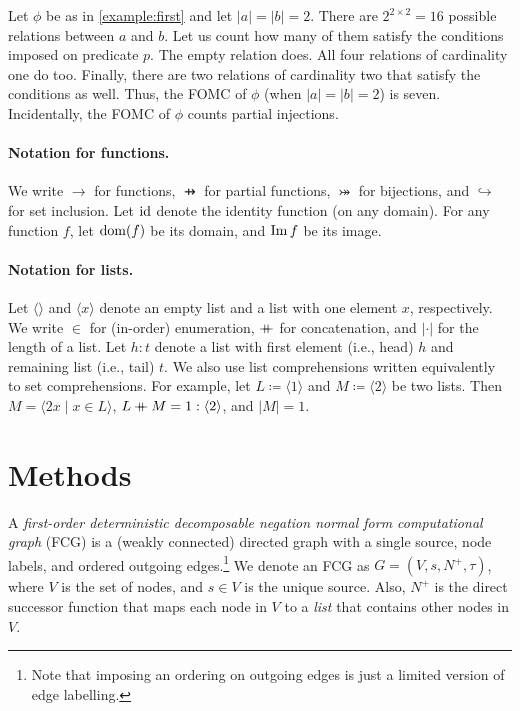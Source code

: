 \begin{example}
  Let $\phi$ be as in \cref{example:first} and let $|a| = |b| = 2$. There are
  $2^{2 \times 2} = 16$ possible relations between $a$ and $b$. Let us count how
  many of them satisfy the conditions imposed on predicate $p$. The empty
  relation does. All four relations of cardinality one do too. Finally, there
  are two relations of cardinality two that satisfy the conditions as well.
  Thus, the FOMC of $\phi$ (when $|a| = |b| = 2$) is seven. Incidentally, the
  FOMC of $\phi$ counts partial injections.
\end{example}

\paragraph{Notation for functions.}
We write $\to$ for functions, $\pfun$ for partial functions,
$\twoheadrightarrowtail$ for bijections, and $\hookrightarrow$ for set
inclusion. Let $\operatorname{id}$ denote the identity function (on any domain). For any
function $f$, let $\operatorname{dom}(f)$ be its domain, and $\operatorname{Im} f$ be its image.

\paragraph{Notation for lists.}
Let $\langle\rangle$ and $\langle x \rangle$ denote an empty list and a list
with one element $x$, respectively. We write $\in$ for (in-order) enumeration,
$\mathbin{+\mkern-10mu+}$ for concatenation, and $|\cdot|$ for the length of a list. Let
$h : t$ denote a list with first element (i.e., head) $h$ and remaining list
(i.e., tail) $t$. We also use list comprehensions written equivalently to set
comprehensions. For example, let $L \coloneqq \langle 1 \rangle$ and
$M \coloneqq \langle 2 \rangle$ be two lists. Then
$M = \langle 2x \mid x \in L \rangle$,
$L \mathbin{+\mkern-10mu+} M = 1 : \langle 2 \rangle$, and $|M| = 1$.

\section{Methods}


A \emph{first-order deterministic decomposable negation normal form
  computational graph} (FCG) is a (weakly connected) directed graph with a
single source, node labels, and ordered outgoing edges.\footnote{Note that
  imposing an ordering on outgoing edges is just a limited version of edge
  labelling.} We denote an FCG as $G = (V, s, N^+, \tau)$, where $V$ is the set
of nodes, and $s \in V$ is the unique source. Also, $N^+$ is the direct
successor function that maps each node in $V$ to a \emph{list} that contains
other nodes in $V$.

